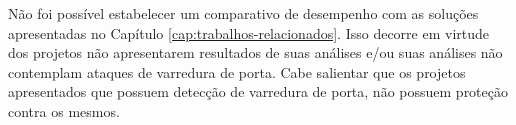 \FloatBarrier

Não foi possível estabelecer um comparativo de desempenho com as soluções apresentadas no Capítulo \ref{cap:trabalhos-relacionados}. Isso decorre em virtude dos projetos não apresentarem resultados de suas análises e/ou suas análises não contemplam ataques de varredura de porta. Cabe salientar que os projetos apresentados que possuem detecção de varredura de porta, não possuem proteção contra os mesmos.
